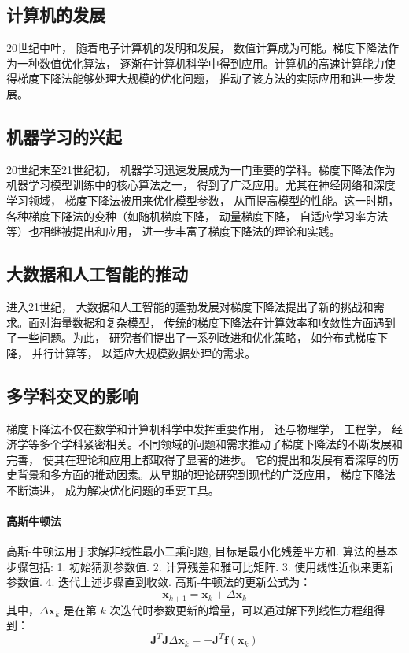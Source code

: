 \documentclass[printMode=false, declarePage=false]{ecnuthesis}
\begin{document}
    \subsection{计算机的发展}
    20世纪中叶， 随着电子计算机的发明和发展， 数值计算成为可能。梯度下降法作为一种数值优化算法， 逐渐在计算机科学中得到应用。计算机的高速计算能力使得梯度下降法能够处理大规模的优化问题， 推动了该方法的实际应用和进一步发展。

    \subsection{机器学习的兴起}
    20世纪末至21世纪初， 机器学习迅速发展成为一门重要的学科。梯度下降法作为机器学习模型训练中的核心算法之一， 得到了广泛应用。尤其在神经网络和深度学习领域， 梯度下降法被用来优化模型参数， 从而提高模型的性能。这一时期， 各种梯度下降法的变种（如随机梯度下降， 动量梯度下降， 自适应学习率方法等）也相继被提出和应用， 进一步丰富了梯度下降法的理论和实践。

    \subsection{大数据和人工智能的推动}
    进入21世纪， 大数据和人工智能的蓬勃发展对梯度下降法提出了新的挑战和需求。面对海量数据和复杂模型， 传统的梯度下降法在计算效率和收敛性方面遇到了一些问题。为此， 研究者们提出了一系列改进和优化策略， 如分布式梯度下降， 并行计算等， 以适应大规模数据处理的需求。

    \subsection{多学科交叉的影响}
    梯度下降法不仅在数学和计算机科学中发挥重要作用， 还与物理学， 工程学， 经济学等多个学科紧密相关。不同领域的问题和需求推动了梯度下降法的不断发展和完善， 使其在理论和应用上都取得了显著的进步。
    它的提出和发展有着深厚的历史背景和多方面的推动因素。从早期的理论研究到现代的广泛应用， 梯度下降法不断演进， 成为解决优化问题的重要工具。

    \paragraph{高斯牛顿法}

    高斯-牛顿法用于求解非线性最小二乘问题, 目标是最小化残差平方和.\cite{lai2017solving}
    算法的基本步骤包括:
    1.
    初始猜测参数值.
    2.
    计算残差和雅可比矩阵.
    3.
    使用线性近似来更新参数值.
    4.
    迭代上述步骤直到收敛.
    高斯-牛顿法的更新公式为：
    \begin{equation}
        \mathbf{x}_{k+1} = \mathbf{x}_k + \Delta \mathbf{x}_k
    \end{equation}
    其中，\(\Delta \mathbf{x}_k\) 是在第 \(k\) 次迭代时参数更新的增量，可以通过解下列线性方程组得到：
    \begin{equation}
        \mathbf{J}^T \mathbf{J} \Delta \mathbf{x}_k = -\mathbf{J}^T \mathbf{f}(\mathbf{x}_k)
    \end{equation}
\end{document}
